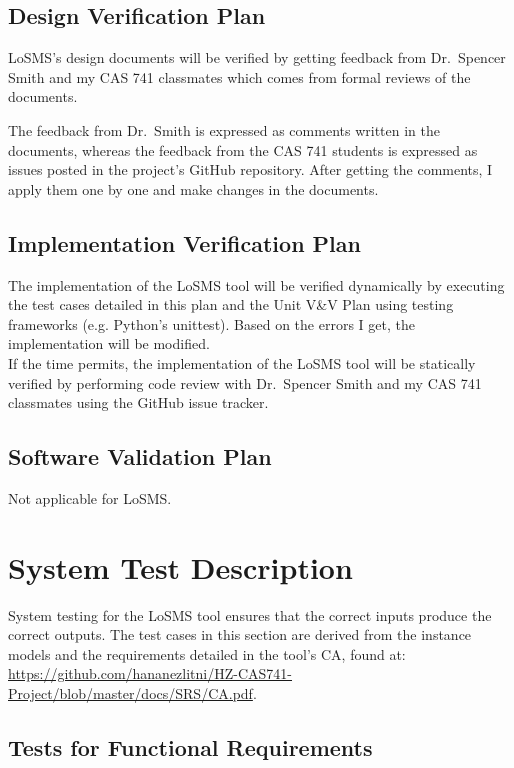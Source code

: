 \documentclass[12pt, titlepage]{article}
\newcommand{\famname}{LoSMS}
\begin{document}
\subsection{Design Verification Plan}

\famname{}'s design documents will be verified by getting feedback from 
Dr.~Spencer Smith and my CAS 741 classmates which comes from formal reviews of 
the documents.

The feedback from Dr.~Smith is expressed as comments written in the documents, 
whereas the feedback from the CAS 741 students is expressed as issues posted in 
the project's GitHub repository. After getting the comments, I apply them one 
by one and make changes in the documents.

\subsection{Implementation Verification Plan}

The implementation of the \famname{} tool will be verified dynamically by 
executing the test cases detailed in this plan and the Unit V\&V Plan using 
testing frameworks (e.g. Python's unittest). Based on the errors I get, the 
implementation will be modified. \\

If the time permits, the implementation of the \famname{} tool will be 
statically verified by performing code review with Dr.~Spencer Smith and my CAS 
741 classmates using the GitHub issue tracker.
 
\subsection{Software Validation Plan}

Not applicable for \famname{}.

\section{System Test Description} \label{SystemTestDescription}

System testing for the \famname{} tool ensures that the correct inputs produce 
the correct outputs. The test cases in this section are derived from the 
instance models and the requirements detailed in the tool's CA, found at: 
\url{https://github.com/hananezlitni/HZ-CAS741-Project/blob/master/docs/SRS/CA.pdf}.

\subsection{Tests for Functional Requirements}
\end{document}
